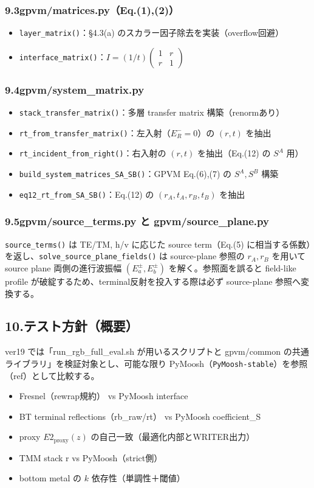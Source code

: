 \documentclass[a4paper,11pt]{jsarticle} %
\begin{document}
\subsubsection*{9.3\;gpvm/matrices.py（Eq.(1),(2)）}
\begin{itemize}
\item \texttt{layer\_matrix()}：\S4.3(a) のスカラー因子除去を実装（overflow回避）
\item \texttt{interface\_matrix()}：$I=(1/t)\begin{pmatrix}1&r\\r&1\end{pmatrix}$
\end{itemize}

\subsubsection*{9.4\;gpvm/system\_matrix.py}
\begin{itemize}
\item \texttt{stack\_transfer\_matrix()}：多層 transfer matrix 構築（renormあり）
\item \texttt{rt\_from\_transfer\_matrix()}：左入射（$E_R^-=0$）の $(r,t)$ を抽出
\item \texttt{rt\_incident\_from\_right()}：右入射の $(r,t)$ を抽出（Eq.(12) の $S^A$ 用）
\item \texttt{build\_system\_matrices\_SA\_SB()}：GPVM Eq.(6),(7) の $S^A,S^B$ 構築
\item \texttt{eq12\_rt\_from\_SA\_SB()}：Eq.(12) の $(r_A,t_A,r_B,t_B)$ を抽出
\end{itemize}

\subsubsection*{9.5\;gpvm/source\_terms.py と gpvm/source\_plane.py}
\texttt{source\_terms()} は TE/TM, h/v に応じた source term（Eq.(5) に相当する係数）を返し、\texttt{solve\_source\_plane\_fields()} は source-plane 参照の $r_A,r_B$ を用いて source plane 両側の進行波振幅 $(E_a^\pm,E_b^\pm)$ を解く。参照面を誤ると field-like profile が破綻するため、terminal反射を投入する際は必ず source-plane 参照へ変換する。

\subsection*{10.\;テスト方針（概要）}
ver19 では「run\_rgb\_full\_eval.sh が用いるスクリプトと gpvm/common の共通ライブラリ」を検証対象とし、可能な限り PyMoosh（\texttt{PyMoosh-stable}）を参照（ref）として比較する。
\begin{itemize}
\item Fresnel（rewrap規約） vs PyMoosh interface
\item BT terminal reflections（rb\_raw/rt） vs PyMoosh coefficient\_S
\item proxy $E2_{\mathrm{proxy}}(z)$ の自己一致（最適化内部とWRITER出力）
\item TMM stack r vs PyMoosh（strict側）
\item bottom metal の $k$ 依存性（単調性＋閾値）
\end{itemize}
\end{document}
